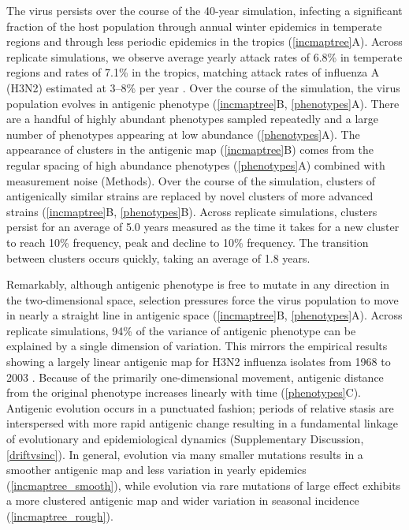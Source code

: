 The virus persists over the course of the 40-year simulation, infecting a significant fraction of the host population through annual winter epidemics in temperate regions and through less periodic epidemics in the tropics (\ref{incmaptree}A).  Across replicate simulations, we observe average yearly attack rates of 6.8\% in temperate regions and rates of 7.1\% in the tropics, matching attack rates of influenza A (H3N2) estimated at 3--8\% per year \cite{Monto93,Koelle09}.  Over the course of the simulation, the virus population evolves in antigenic phenotype (\ref{incmaptree}B, \ref{phenotypes}A).  There are a handful of highly abundant phenotypes sampled repeatedly and a large number of phenotypes appearing at low abundance (\ref{phenotypes}A).  The appearance of clusters in the antigenic map (\ref{incmaptree}B) comes from the regular spacing of high abundance phenotypes (\ref{phenotypes}A) combined with measurement noise (Methods).  Over the course of the simulation, clusters of antigenically similar strains are replaced by novel clusters of more advanced strains (\ref{incmaptree}B, \ref{phenotypes}B).  Across replicate simulations, clusters persist for an average of 5.0 years measured as the time it takes for a new cluster to reach 10\% frequency, peak and decline to 10\% frequency.  The transition between clusters occurs quickly, taking an average of 1.8 years.

Remarkably, although antigenic phenotype is free to mutate in any direction in the two-dimensional space, selection pressures force the virus population to move in nearly a straight line in antigenic space (\ref{incmaptree}B, \ref{phenotypes}A).  Across replicate simulations, 94\% of the variance of antigenic phenotype can be explained by a single dimension of variation.  This mirrors the empirical results showing a largely linear antigenic map for H3N2 influenza isolates from 1968 to 2003 \cite{Smith04}.  Because of the primarily one-dimensional movement, antigenic distance from the original phenotype increases linearly with time (\ref{phenotypes}C).  Antigenic evolution occurs in a punctuated fashion; periods of relative stasis are interspersed with more rapid antigenic change resulting in a fundamental linkage of evolutionary and epidemiological dynamics (Supplementary Discussion, \ref{driftvsinc}).  In general, evolution via many smaller mutations results in a smoother antigenic map and less variation in yearly epidemics (\ref{incmaptree_smooth}), while evolution via rare mutations of large effect exhibits a more clustered antigenic map and wider variation in seasonal incidence (\ref{incmaptree_rough}).

